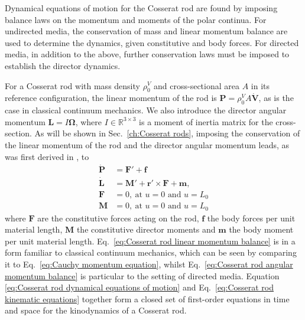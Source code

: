 Dynamical equations of motion for the Cosserat rod are found by imposing balance laws on the momentum and moments of the polar continua. For undirected media, the conservation of mass and linear momentum balance are used to determine the dynamics, given constitutive and body forces. For directed media, in addition to the above, further conservation laws must be imposed to establish the director dynamics.

For a Cosserat rod with mass density $\rho_0^V$ and cross-sectional area $A$ in its reference configuration, the linear momentum of the rod is $\mathbf{P} = \rho^V_0 A \dot{\mathbf{V}}$, as is the case in classical continuum mechanics. We also introduce the director angular momentum $\mathbf{L} = I \boldsymbol{\Omega}$, where $I \in \mathbb{R}^{3 \times 3}$ is a moment of inertia matrix for the cross-section. As will be shown in Sec.~\ref{ch:Cosserat rods}, imposing the conservation of the linear momentum of the rod and the director angular momentum leads, as was first derived in \citep{cosseratTheoryDeformableBodies1909}, to
\begin{subequations} \label{eq:Cosserat rod dynamical equations of motion}
  \begin{align}
\dot{\mathbf{P}} & = \mathbf{F}' + \mathbf{f} \label{eq:Cosserat rod linear momentum balance} \\
\dot{\mathbf{L}} & = \mathbf{M}' + \mathbf{r}' \times \mathbf{F} + \mathbf{m}, \label{eq:Cosserat rod angular momentum balance} \\
\mathbf{F} & = 0,\ \text{at } u=0 \text{ and } u=L_0 \label{eq:Cosserat rod F bc}  \\
\mathbf{M} & = 0,\ \text{at } u=0 \text{ and } u=L_0 \label{eq:Cosserat rod M bc}
  \end{align}
\end{subequations}
where $\mathbf{F}$ are the constitutive forces acting on the rod, $\mathbf{f}$ the body forces per unit material length, $\mathbf{M}$ the constitutive director moments and $\mathbf{m}$ the body moment per unit material length. Eq.~\ref{eq:Cosserat rod linear momentum balance} is in a form familiar to classical continuum mechanics, which can be seen by comparing it to Eq.~\ref{eq:Cauchy momentum equation}, whilst Eq.~\ref{eq:Cosserat rod angular momentum balance} is particular to the setting of directed media. Equation \ref{eq:Cosserat rod dynamical equations of motion} and Eq.~\ref{eq:Cosserat rod kinematic equations} together form a closed set of first-order equations in time and space for the kinodynamics of a Cosserat rod.

